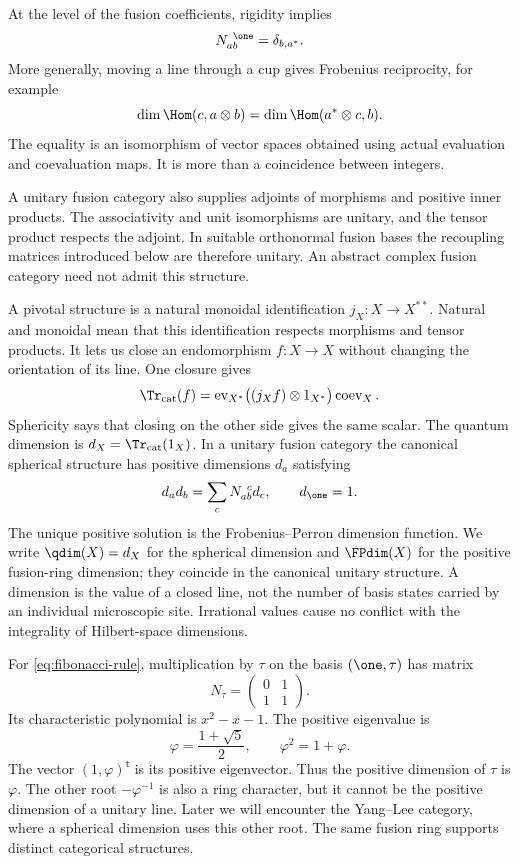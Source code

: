 At the level of the fusion coefficients, rigidity implies
\begin{equation}
 N_{ab}^{\ \one}=\delta_{b,a^*}.
 \label{eq:dual-vacuum}
\end{equation}
More generally, moving a line through a cup gives Frobenius reciprocity,
for example
\[
 \dim\Hom(c,a\otimes b)=\dim\Hom(a^*\otimes c,b).
\]
The equality is an isomorphism of vector spaces obtained using actual
evaluation and coevaluation maps.  It is more than a coincidence
between integers.

A unitary fusion category also supplies adjoints of morphisms and
positive inner products.  The associativity and unit isomorphisms are
unitary, and the tensor product respects the adjoint.  In suitable
orthonormal fusion bases the recoupling matrices introduced below are
therefore unitary.  An abstract complex fusion category need not admit
this structure.

A pivotal structure is a natural monoidal identification
$j_X:X\to X^{**}$. Natural and monoidal mean that this identification
respects morphisms and tensor products. It lets us close an
endomorphism $f:X\to X$
without changing the orientation of its line. One closure gives
\[
 \Tr_{\rm cat}(f)
 =\operatorname{ev}_{X^*}
   \bigl((j_Xf)\otimes1_{X^*}\bigr)
   \operatorname{coev}_X.
\]
Sphericity says that closing on the other side gives the same scalar.
The quantum dimension is $d_X=\Tr_{\rm cat}(1_X)$.
In a unitary fusion category the canonical spherical structure has
positive dimensions $d_a$ satisfying
\begin{equation}
 d_a d_b=\sum_c N_{ab}^{\ c}d_c,
 \qquad d_{\one}=1.
 \label{eq:dimension-character}
\end{equation}
The unique positive solution is the Frobenius--Perron dimension
function. We write $\qdim(X)=d_X$ for the spherical dimension and
$\FPdim(X)$ for the positive fusion-ring dimension; they coincide
in the canonical unitary structure. A dimension is the value of a
closed line, not the number
of basis states carried by an individual microscopic site.  Irrational
values cause no conflict with the integrality of Hilbert-space
dimensions.

\begin{example}
For \eqref{eq:fibonacci-rule}, multiplication by $\tau$ on the basis
$(\one,\tau)$ has matrix
\[
 N_\tau=\begin{pmatrix}0&1\\1&1\end{pmatrix}.
\]
Its characteristic polynomial is $x^2-x-1$.  The positive eigenvalue
is
\[
 \varphi=\frac{1+\sqrt5}{2},\qquad \varphi^2=1+\varphi.
\]
The vector $(1,\varphi)^{\mathsf t}$ is its positive eigenvector.
Thus the positive dimension of $\tau$ is $\varphi$.
The other root $-\varphi^{-1}$ is also a ring character, but it cannot
be the positive dimension of a unitary line.  Later we will encounter
the Yang--Lee category, where a spherical dimension uses this other
root.  The same fusion ring supports distinct categorical structures.
\end{example}

